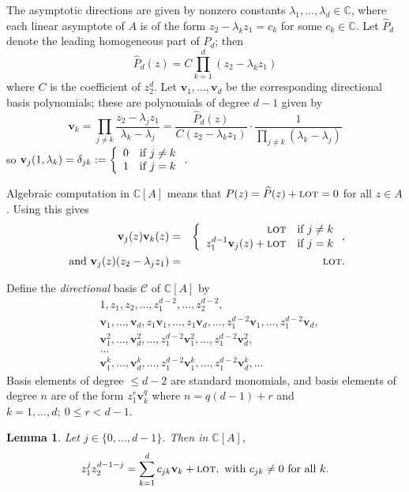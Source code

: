 \documentclass[12pt]{article}
\numberwithin{equation}{section}
\newtheorem{lemma}[theorem]{Lemma}
\newcommand{\C}{\mathbb{C}}
\renewcommand{\hat}{\widehat}
\newcommand{\calC}{\mathcal{C}}
\newcommand{\lot}{\text{\sc lot}}
\newcommand{\bv}{\mathbf{v}}
\begin{document}
  The asymptotic directions are given by nonzero constants $\lambda_1,\ldots,\lambda_d\in\C$, where each linear asymptote of $A$ is of the form $z_2-\lambda_kz_1=c_k$ for some $c_k\in \C$. Let $\hat P_d$ denote the leading homogeneous part of $P_d$; then 
$$\hat P_d(z) = C\prod_{k=1}^d (z_2-\lambda_kz_1)$$ where $C$ is the coefficient of $z_2^d$.  Let  $\bv_1,\ldots,\bv_d$ be the corresponding directional basis polynomials; these are polynomials of degree $d-1$ given by 
$$
\bv_k = \prod_{j\neq k} \frac{z_2-\lambda_jz_1}{\lambda_k - \lambda_j} = \frac{\hat P_d(z)}{C(z_2-\lambda_kz_1)}\cdot \frac{1}{\prod_{j\neq k}(\lambda_k - \lambda_j)}
$$
 so $\bv_j(1,\lambda_k)=\delta_{jk}:=\left\{ \begin{array}{rl} 0 &\hbox{if } j\neq k \\ 1&\hbox{if }j=k \end{array}\right. .$  

Algebraic computation in $ \C[A]$ means that $P(z)=\hat P(z)+\lot =0$ for all $z\in A$. Using this gives
\begin{eqnarray}
 \bv_j(z)\bv_k(z) &=&
 \left\{ \begin{array}{rl}  \lot &\hbox{if } j\neq k\\
 z_1^{d-1}\bv_j(z) +\lot &\hbox{if } j= k   \end{array}\right. ,  \label{eqn:vmult}  \\
\hbox{ and } \bv_j(z)(z_2-\lambda_jz_1) &=& \lot. \label{eqn:vA}
\end{eqnarray}



Define the \emph{directional} basis $\calC$ of $ \C[A]$ by 
$$\begin{aligned}
&1,z_1,z_2,\ldots, z_1^{d-2},\ldots, z_2^{d-2},    \\
&\bv_1,\ldots,\bv_d, z_1\bv_1,\ldots,z_1\bv_d,\ldots, z_1^{d-2}\bv_1,\ldots,z_1^{d-2}\bv_d,\\ 
&\bv_1^2,\ldots,\bv_d^2,\ldots, z_1^{d-2}\bv_1^2,\ldots,z_1^{d-2}\bv_d^2,\\
&\ldots \\
&\bv_1^k,\ldots,\bv_d^k,\ldots, z_1^{d-2}\bv_1^k,\ldots,z_1^{d-2}\bv_d^k,\ldots 
\end{aligned}$$
Basis elements of degree $\leq d-2$ are standard monomials, and basis elements of degree $n$ are of the form $z_1^r\bv_k^q$ where $n=q(d-1)+r$ and $k=1,...,d; \ 0\leq r<d-1$.  


\begin{lemma}\label{lem:cjk}
  Let $j\in\{0,\ldots,d-1\}$. Then in $\C[A]$, 
\begin{equation*}%
\displaystyle z_1^jz_2^{d-1-j} = \sum_{k=1}^{d} c_{jk}\bv_k +\lot,  \hbox{ with $c_{jk}\neq 0$ for all $k$.}
\end{equation*}
\end{lemma}
\end{document}
